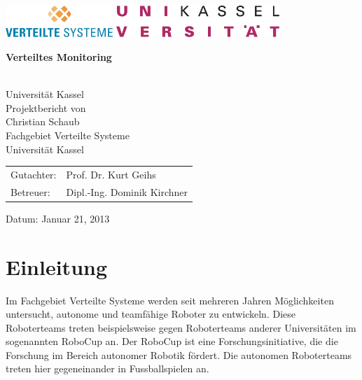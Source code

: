 \documentclass[
	11pt,								%
	a4paper,						%
	oneside,						%
	titlepage,					%
	headsepline,				%
	DIV13,							%
	abstracton,	 				%
	BCOR0cm,						%
	bibliography=totoc, %
]{scrreprt}							%
\begin{document}
	\thispagestyle{empty}
	\includegraphics[height=1.2cm]{images/vsLogo.png}
	\hfill\includegraphics[height=1.2cm]{images/uniLogo.pdf}\\[1cm]

	\begin{center}
		\begin{LARGE}\bfseries Verteiltes Monitoring\end{LARGE}\\
		[2cm]
		\Large{Universität Kassel}\\
		[1cm]
		\large{Projektbericht von}\\
		\Large{Christian Schaub}\\
		[1cm]
		\large \Large{Fachgebiet Verteilte Systeme \\
		Universität Kassel}\\
		[1cm]
	\end{center}
	


	\vfill
	\begin{Large}
		\begin{tabular}{l l}
			Gutachter: & Prof. Dr. Kurt Geihs\\
			[1cm]
			Betreuer: & Dipl.-Ing. Dominik Kirchner\\
		\end{tabular}
	\end{Large}
	\vfill

	\begin{center}Datum: Januar 21, 2013\end{center}

	

	\tableofcontents

	
\chapter{Einleitung}
\label{cha:Einleitung}

Im Fachgebiet Verteilte Systeme werden seit mehreren Jahren Möglichkeiten untersucht, autonome und teamfähige
Roboter zu entwickeln. Diese Roboterteams treten beispielsweise gegen Roboterteams anderer Universitäten im sogenannten RoboCup an. Der RoboCup ist eine Forschungsinitiative, die die Forschung im
Bereich autonomer Robotik fördert. Die autonomen Roboterteams treten hier gegeneinander in Fussballspielen an.\\
\end{document}

